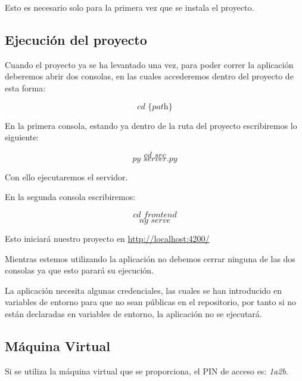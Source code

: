 Esto es necesario solo para la primera vez que se instala el proyecto.

\subsection{Ejecución del proyecto}
Cuando el proyecto ya se ha levantado una vez, para poder correr la aplicación deberemos abrir dos consolas, en las cuales accederemos dentro del proyecto de esta forma:

$$\textit{cd \{path\}}$$

En la primera consola, estando ya dentro de la ruta del proyecto escribiremos lo siguiente:

$$\textit{cd src}$$
$$\textit{py server.py}$$

Con ello ejecutaremos el servidor.

En la segunda consola escribiremos:

$$\textit{cd frontend}$$
$$\textit{ng serve}$$

Esto iniciará nuestro proyecto en \url{http://localhost:4200/}

Mientras estemos utilizando la aplicación no debemos cerrar ninguna de las dos consolas ya que esto parará su ejecución.

La aplicación necesita algunas credenciales, las cuales se han introducido en variables de entorno para que no sean públicas en el repositorio, por tanto si no están declaradas en variables de entorno, la aplicación no se ejecutará.

\subsection{Máquina Virtual}
Si se utiliza la máquina virtual que se proporciona, el PIN de acceso es: \textit{1a2b}.
